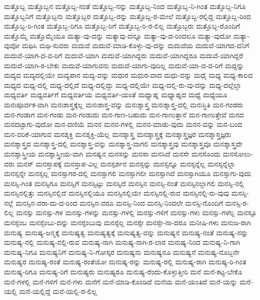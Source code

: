 {ಮತ್ತೊಬ್ಬ
ಮತ್ತೊಬ್ಬನ
ಮತ್ತೊಬ್ಬ-ನಂತೆ
ಮತ್ತೊಬ್ಬ-ನನ್ನು
ಮತ್ತೊಬ್ಬ-ನಿಂದ
ಮತ್ತೊಬ್ಬ-ನಿ-ಗಿಂತ
ಮತ್ತೊಬ್ಬ-ನಿಗೂ
ಮತ್ತೊಬ್ಬನಿಗೆ
ಮತ್ತೊಬ್ಬನು
ಮತ್ತೊಬ್ಬರ
ಮತ್ತೊಬ್ಬ-ರನ್ನು
ಮತ್ತೊಬ್ಬ-ರ-ಮೇಲೆ
ಮತ್ತೊಬ್ಬ-ರಲ್ಲಿದ್ದ
ಮತ್ತೊಬ್ಬ-ರಿಂದ
ಮತ್ತೊಬ್ಬ-ರಿ-ಗಿಂತ
ಮತ್ತೊಬ್ಬ-ರಿಗೂ
ಮತ್ತೊಬ್ಬ-ರಿಗೆ
ಮತ್ತೊಬ್ಬ-ರಿ-ರ-ಲಿಲ್ಲ
ಮತ್ತೊಬ್ಬರು
ಮತ್ತೊಬ್ಬ-ರೊಂದಿಗೆ
ಮತ್ತೊಮ್ಮೆ
ಮತ್ತೊಮ್ಮೆಯೂ
ಮತ್ಯಾ-ವು-ದನ್ನು
ಮತ್ಯಾವು-ದನ್ನೂ
ಮತ್ಯಾ-ವು-ದ-ರಿಂದಲೂ
ಮತ್ಯಾ-ವುದೋ
ಮತ್ಯಾ-ವುವೋ
ಮಥಿಸಿ
ಮಥಿ-ಸುವರು
ಮದುವೆ
ಮದುವೆ-ಮಾಡಿ-ಕೊಳ್ಳು-ವು-ದನ್ನು
ಮದುವೆಯ
ಮದುವೆ-ಯಾಗದ-ವನಿಗೆ
ಮದುವೆ-ಯಾಗ-ದ-ವ-ರಿಗೆ
ಮದುವೆ-ಯಾಗಿ
ಮದುವೆ-ಯಾಗಿದ್ದರು
ಮದುವೆ-ಯಾಗಿದ್ದರೂ
ಮದುವೆ-ಯಾಗಿದ್ದರೆ
ಮದುವೆ-ಯಾಗಿ-ರ-ಬೇಕು
ಮದುವೆ-ಯಾಗುವನು
ಮದುವೆ-ಯಾಗು-ವುದಿಲ್ಲ
ಮದುವೆ-ಯಾ-ದ-ವ-ರಿಗೆ
ಮದ್ದನ್ನು
ಮದ್ಯದ
ಮದ್ಯದಲ್ಲಿಯೇ
ಮದ್ಯಪಾನ
ಮದ್ಯ-ವನ್ನು
ಮಧುರ
ಮಧುರ-ವಾದ
ಮಧು-ವನ್ನು
ಮಧೈ
ಮಧ್ಯ
ಮಧ್ಯ-ಕಾಲದ
ಮಧ್ಯದ
ಮಧ್ಯ-ದಲ್ಲಿ
ಮಧ್ಯ-ದಲ್ಲಿದೆ
ಮಧ್ಯ-ದಲ್ಲಿದ್ದು
ಮಧ್ಯ-ದಲ್ಲಿಯೇ
ಮಧ್ಯ-ದಲ್ಲಿ-ರು-ವು-ದನ್ನು
ಮಧ್ಯ-ದಲ್ಲೆಲ್ಲಾ
ಮಧ್ಯವರ್ತಿ
ಮಧ್ಯವರ್ತಿಗೆ
ಮಧ್ಯವರ್ತಿಯ
ಮಧ್ಯವರ್ತಿ-ಯಂತೆ
ಮಧ್ಯಾಹ್ನ
ಮಧ್ಯಾಹ್ನದ
ಮಧ್ಯೆ
ಮಧ್ಯೆಯೂ
ಮನಃಪೂರ್ವಕ-ವಾಗಿ
ಮನಃಶಾಸ್ತ್ರಕ್ಕೆಲ್ಲ
ಮನಃಶಾಸ್ತ್ರ-ವನ್ನು
ಮನಃಶ್ಶಾಸ್ತ್ರ
ಮನಃಶ್ಶಾಸ್ತ್ರ-ದಲ್ಲಿ
ಮನಃಸ್ಥಿತಿ
ಮನ-ಗಂಡರು
ಮನ-ಗಂಡಾಗ
ಮನ-ಗಂಡು
ಮನ-ಗಂಡುದು
ಮನ-ಗಾಣ-ಬಹುದು
ಮನ-ಗಾಣುತ್ತಾನೆ
ಮನ-ಗಾಣುತ್ತೇವೆ
ಮನದ
ಮನದಟ್ಟಾಗು-ವುದೋ
ಮನ-ದಣಿಯೆ
ಮನನ
ಮನನ-ಗಳಲ್ಲಿ
ಮನನ-ಮಾಡು-ವುದು
ಮನನ-ವನ್ನು
ಮನ-ಬಂದ
ಮನ-ವರಿಕೆ-ಯಾಗುವ
ಮನಶ್ಶಕ್ತಿ
ಮನಶ್ಶಕ್ತಿ-ಯೆಲ್ಲ
ಮನಶ್ಶಾಸ್ತ್ರ
ಮನಶ್ಶಾಸ್ತ್ರಕ್ಕೆ
ಮನಶ್ಶಾಸ್ತ್ರಜ್ಞರ
ಮನಶ್ಶಾಸ್ತ್ರಜ್ಞರು
ಮನಶ್ಶಾಸ್ತ್ರದ
ಮನಶ್ಶಾಸ್ತ್ರ-ದಲ್ಲಿ
ಮನಶ್ಶಾಸ್ತ್ರ-ವನ್ನು
ಮನಶ್ಶಾಸ್ತ್ರ-ವಾಗಲಿ
ಮನಶ್ಶಾಸ್ತ್ರವು
ಮನಶ್ಶಾಸ್ತ್ರವೂ
ಮನಶ್ಶಾಸ್ತ್ರವೇ
ಮನಶ್ಶಾಸ್ತ್ರೀಯ
ಮನಶ್ಶಾಸ್ತ್ರೀಯ-ವಾಗಿ
ಮನಷ್ಯನ
ಮನಸನ್ನು
ಮನಸಾ
ಮನಸಿದೆ
ಮನಸೇ
ಮನಸೊಂದು
ಮನಸೋಲು-ವರು
ಮನಸ್
ಮನಸ್ತಾಪಕ್ಕೆ
ಮನಸ್ತಾಪ-ವಿಲ್ಲ
ಮನಸ್ಪರ್ಶನ
ಮನಸ್ಸನ್ನು
ಮನಸ್ಸನ್ನೂ
ಮನಸ್ಸನ್ನೆಲ್ಲ
ಮನಸ್ಸನ್ನೆಲ್ಲಾ
ಮನಸ್ಸನ್ನೇ
ಮನಸ್ಸಲ್ಲ
ಮನಸ್ಸಾಗರ-ದಲ್ಲಿ
ಮನಸ್ಸಾಗಲಿ
ಮನಸ್ಸಾಗಲೀ
ಮನಸ್ಸಾಗಿದೆ
ಮನಸ್ಸಾಗಿಯೂ
ಮನಸ್ಸಾಗು-ವುದು
ಮನಸ್ಸಿ-ಗಿಂತ
ಮನಸ್ಸಿಗೂ
ಮನಸ್ಸಿಗೆ
ಮನಸ್ಸಿಟ್ಟು
ಮನಸ್ಸಿದೆ
ಮನಸ್ಸಿನ
ಮನಸ್ಸಿ-ನಂತೆ
ಮನಸ್ಸಿನಲ್ಲಾಗಲಿ
ಮನಸ್ಸಿ-ನಲ್ಲಿ
ಮನಸ್ಸಿನಲ್ಲಿತ್ತು
ಮನಸ್ಸಿನಲ್ಲಿದೆ
ಮನಸ್ಸಿನಲ್ಲಿಯೂ
ಮನಸ್ಸಿನಲ್ಲಿಯೇ
ಮನಸ್ಸಿನಲ್ಲಿ-ರುವ
ಮನಸ್ಸಿನಲ್ಲಿ-ರು-ವುವು
ಮನಸ್ಸಿ-ನಲ್ಲೆ
ಮನಸ್ಸಿನ-ವರಾ-ದು-ದ-ರಿಂದ
ಮನಸ್ಸಿನ-ವರೂ
ಮನಸ್ಸಿ-ನಿಂದ
ಮನಸ್ಸಿ-ನಿಂದಲೇ
ಮನಸ್ಸಿ-ನೊಂದಿಗೆ
ಮನಸ್ಸಿ-ರ-ಲಿಲ್ಲ
ಮನಸ್ಸು
ಮನಸ್ಸು-ಗಳ
ಮನಸ್ಸು-ಗಳನ್ನು
ಮನಸ್ಸು-ಗಳಲ್ಲಿ
ಮನಸ್ಸು-ಗಳಿಗೆ
ಮನಸ್ಸು-ಗಳು
ಮನಸ್ಸು-ಗಳೆಲ್ಲ
ಮನಸ್ಸೂ
ಮನಸ್ಸೆಂಬ
ಮನಸ್ಸೆಂಬು-ದನ್ನು
ಮನಸ್ಸೆಂಬುವು
ಮನಸ್ಸೆಲ್ಲ
ಮನಸ್ಸೇ
ಮನಸ್ಸೇ-ನಾ-ದರೂ
ಮನೀಷಿ-ಗಳು
ಮನುಜ-ರಾಗಿ
ಮನುಷ್ಯ
ಮನುಷ್ಯ-ಜನ್ಮಕ್ಕೆ
ಮನುಷ್ಯತ್ವ
ಮನುಷ್ಯತ್ವಕ್ಕೆ
ಮನುಷ್ಯತ್ವ-ವನ್ನು
ಮನುಷ್ಯನ
ಮನುಷ್ಯ-ನಂತೆ
ಮನುಷ್ಯ-ನನ್ನು
ಮನುಷ್ಯ-ನಲ್ಲಿ
ಮನುಷ್ಯ-ನಲ್ಲಿ-ರುವ
ಮನುಷ್ಯ-ನಾಗಿ
ಮನುಷ್ಯ-ನಾಗಿ-ರ-ಲಾರ
ಮನುಷ್ಯ-ನಿಂದ
ಮನುಷ್ಯ-ನಿ-ಗಾಗಿ
ಮನುಷ್ಯ-ನಿಗೂ
ಮನುಷ್ಯನಿಗೆ
ಮನುಷ್ಯ-ನಿ-ಗೋಸ್ಕರ
ಮನುಷ್ಯನು
ಮನುಷ್ಯನೂ
ಮನುಷ್ಯನೆ
ಮನುಷ್ಯ-ನೊಬ್ಬನೇ
ಮನುಷ್ಯರ
ಮನುಷ್ಯ-ರಂತೆ
ಮನುಷ್ಯ-ರಂತೆಯೋ
ಮನುಷ್ಯ-ರನ್ನು
ಮನುಷ್ಯ-ರಲ್ಲಿ
ಮನುಷ್ಯ-ರಾಗಿ
ಮನುಷ್ಯ-ರಿ-ಗಿಂತ
ಮನುಷ್ಯ-ರಿಗೂ
ಮನುಷ್ಯ-ರಿಗೆ
ಮನುಷ್ಯರು
ಮನುಷ್ಯರೂ
ಮನುಷ್ಯ-ರೆಂದು-ಕೊಳ್ಳುತ್ತೀರಿ
ಮನೆ
ಮನೆ-ಕಟ್ಟ-ಬೇಕೊ
ಮನೆ-ಗಳಲ್ಲಿ
ಮನೆ-ಗಳಿಗೆ
ಮನೆ-ಗಳು
ಮನೆಗೆ
ಮನೆ-ಮಾಡಿ-ಕೊಂಡಿದೆ
ಮನೆಯ
ಮನೆ-ಯಂತಿದೆ
ಮನೆ-ಯನ್ನು
ಮನೆ-ಯಲ್ಲಿ
ಮನೆ-ಯಲ್ಲಿದ್ದೆ
ಮನೆ-ಯಲ್ಲಿ-ರ-ಲಿಲ್ಲ
}
